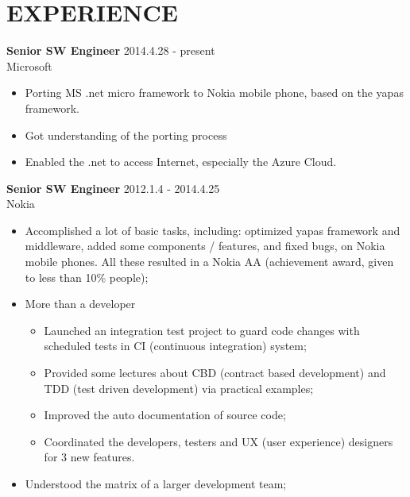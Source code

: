
\section{EXPERIENCE}
\textbf{Senior SW Engineer} \hfill 2014.4.28 - present\\
        Microsoft
        \begin{itemize}  \itemsep -2pt %
                \item Porting MS .net micro framework to Nokia mobile phone, based on the yapas framework.
                \item Got understanding of the porting process
                \item Enabled the .net to access Internet, especially the Azure Cloud.
        \end{itemize}

\textbf{Senior SW Engineer} \hfill 2012.1.4 - 2014.4.25\\
        Nokia
        \begin{itemize}  \itemsep -2pt %
        \item Accomplished a lot of basic tasks, including:
            optimized yapas framework and middleware, added some components / features, and fixed bugs,
        on Nokia mobile phones.
        All these resulted in a Nokia AA (achievement award, given to less than 10\% people);
        \item More than a developer 
            \begin{itemize}  \itemsep -2pt
                \item Launched an integration test project to guard code changes
                with scheduled tests in CI (continuous integration) system;
                \item Provided some lectures about CBD (contract based development) and
                TDD (test driven development) via practical examples;
                \item Improved the auto documentation of source code;
                \item Coordinated the developers, testers and UX (user experience) designers for 3 new features.
            \end{itemize}
        \item Understood the matrix of a larger development team;
        \end{itemize}

